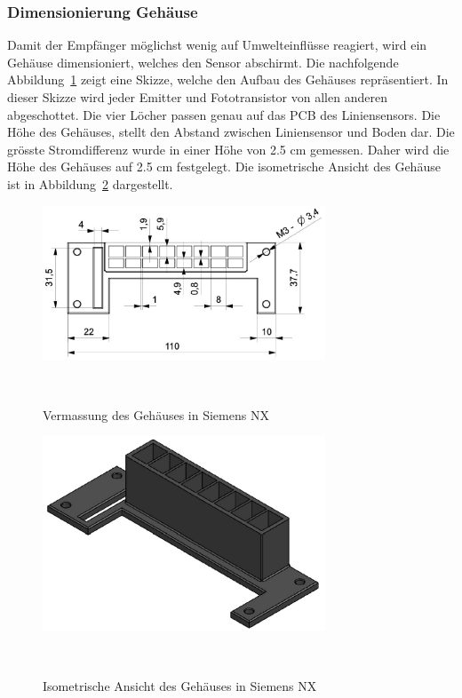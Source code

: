 \documentclass[main.tex]{subfiles} %
\begin{document}
\subsubsection*{Dimensionierung Gehäuse}
Damit der Empfänger möglichst wenig auf Umwelteinflüsse reagiert, wird ein
Gehäuse dimensioniert, welches den Sensor abschirmt. Die nachfolgende
Abbildung~\ref{fig:Gehaeuse_Vermasst} zeigt eine Skizze, welche den Aufbau des Gehäuses repräsentiert.
In dieser Skizze wird jeder Emitter und Fototransistor von allen anderen abgeschottet. Die vier Löcher
passen genau auf das PCB des Liniensensors. Die Höhe des Gehäuses, stellt den Abstand zwischen Liniensensor
und Boden dar. Die grösste Stromdifferenz wurde in einer Höhe von 2.5 cm gemessen. Daher wird die Höhe
des Gehäuses auf 2.5 cm festgelegt.
Die isometrische Ansicht des Gehäuse ist in Abbildung~\ref{fig:Gehaeuse_Isometrisch} dargestellt.

\begin{figure}[H]
    \centering
    \includegraphics[width=0.75\textwidth]{./fig_Liniensensor/Gehaeuse_Vermasst.pdf}
    \caption{Vermassung des Gehäuses in Siemens NX}~\label{fig:Gehaeuse_Vermasst}
\end{figure}

\begin{figure}[H]
    \centering
    \includegraphics[width=0.75\textwidth]{./fig_Liniensensor/Gehaeuse_Isometrisch.pdf}
    \caption{Isometrische Ansicht des Gehäuses in Siemens NX}~\label{fig:Gehaeuse_Isometrisch}
\end{figure}
\end{document}
